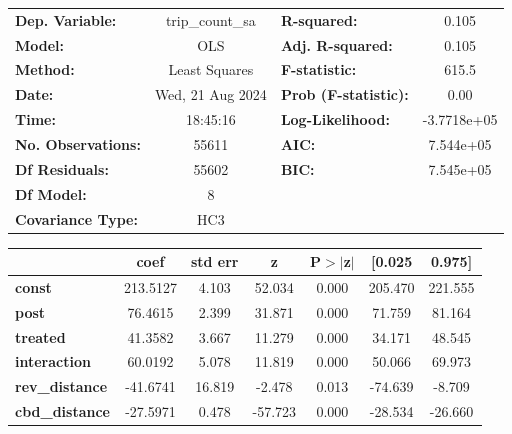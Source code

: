 \begin{center}
\begin{tabular}{lclc}
\toprule
\textbf{Dep. Variable:}    & trip\_count\_sa  & \textbf{  R-squared:         } &      0.105   \\
\textbf{Model:}            &       OLS        & \textbf{  Adj. R-squared:    } &      0.105   \\
\textbf{Method:}           &  Least Squares   & \textbf{  F-statistic:       } &      615.5   \\
\textbf{Date:}             & Wed, 21 Aug 2024 & \textbf{  Prob (F-statistic):} &      0.00    \\
\textbf{Time:}             &     18:45:16     & \textbf{  Log-Likelihood:    } & -3.7718e+05  \\
\textbf{No. Observations:} &       55611      & \textbf{  AIC:               } &  7.544e+05   \\
\textbf{Df Residuals:}     &       55602      & \textbf{  BIC:               } &  7.545e+05   \\
\textbf{Df Model:}         &           8      & \textbf{                     } &              \\
\textbf{Covariance Type:}  &       HC3        & \textbf{                     } &              \\
\bottomrule
\end{tabular}
\begin{tabular}{lcccccc}
                       & \textbf{coef} & \textbf{std err} & \textbf{z} & \textbf{P$> |$z$|$} & \textbf{[0.025} & \textbf{0.975]}  \\
\midrule
\textbf{const}         &     213.5127  &        4.103     &    52.034  &         0.000        &      205.470    &      221.555     \\
\textbf{post}          &      76.4615  &        2.399     &    31.871  &         0.000        &       71.759    &       81.164     \\
\textbf{treated}       &      41.3582  &        3.667     &    11.279  &         0.000        &       34.171    &       48.545     \\
\textbf{interaction}   &      60.0192  &        5.078     &    11.819  &         0.000        &       50.066    &       69.973     \\
\textbf{rev\_distance} &     -41.6741  &       16.819     &    -2.478  &         0.013        &      -74.639    &       -8.709     \\
\textbf{cbd\_distance} &     -27.5971  &        0.478     &   -57.723  &         0.000        &      -28.534    &      -26.660     \\

\end{tabular}
\end{center}
